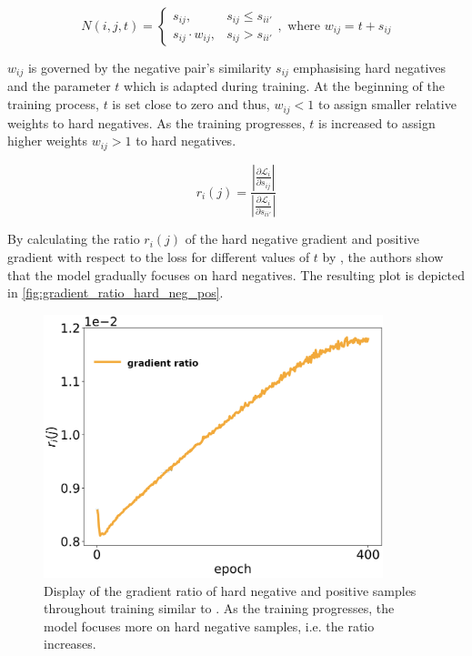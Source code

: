 \begin{equation}
    N(i,j,t) = \left\{\begin{array}{ll} s_{ij}, & s_{ij} \le s_{ii'} \\
        s_{ij} \cdot  w_{ij}, & s_{ij} > s_{ii'}\end{array}\right. ,\text{ where }w_{ij} = t + s_{ij}
    \label{eq:curricular_negative_weighting}
\end{equation}

$w_{ij}$ is governed by the negative pair's similarity $s_{ij}$ emphasising hard negatives 
and the parameter $t$ which is adapted during training.
At the beginning of the training process, $t$ is set close to zero and thus, $w_{ij} < 1$ 
to assign smaller relative weights to hard negatives.
As the training progresses, $t$ is increased to assign higher weights $w_{ij} > 1$ to hard negatives.

\begin{equation}
    r_i(j) = \frac{\left| \frac{\partial \mathcal{L}_i}{\partial s_{ij}} \right|}
    {\left| \frac{\partial \mathcal{L}_i}{\partial s_{ii'}} \right|}
    \label{eq:curricular_weighting_ratio}
\end{equation}


By calculating the ratio $r_i(j)$ of the hard negative gradient and positive gradient 
with respect to the loss for different values of $t$ by , 
the authors show that the model gradually focuses on hard negatives.
The resulting plot is depicted in \autoref{fig:gradient_ratio_hard_neg_pos}.

\begin{figure}[!htb] %
    \centering
    \includegraphics[width=280pt]{images/ratio_hard_neg_pos_gradients_only_ratio.png}
    \caption{Display of the gradient ratio of hard negative and positive samples throughout training 
    similar to \citet{curricular_weighting_2024}.
    As the training progresses, the model focuses more on hard negative samples, i.e. the ratio increases.
    }
    \label{fig:gradient_ratio_hard_neg_pos}
\end{figure}

